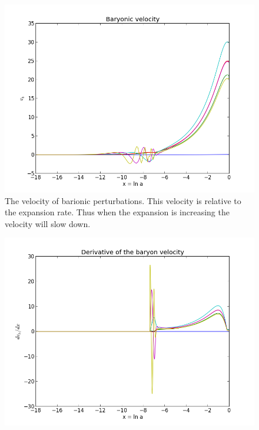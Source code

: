 \documentclass[norsk,a4paper,12pt]{article}
\begin{document}
\begin{figure}[H] 
\begin{center} 
\includegraphics[scale=0.5]{v_b.png} 
 

\caption{The velocity of barionic perturbations. This velocity is relative to the expansion rate. Thus when the expansion is increasing the velocity will slow down.} 
\end{center} 
\end{figure}

\begin{figure}[H] 
\begin{center} 
\includegraphics[scale=0.5]{dv_b.png} 
 

\caption{} 
\end{center} 
\end{figure}
\end{document}
